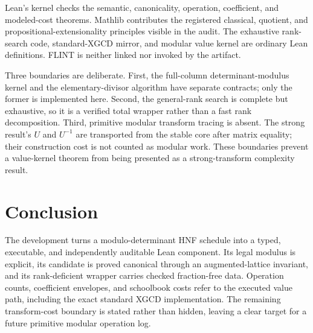 \documentclass[11pt]{article}
\begin{document}
Lean's kernel checks the semantic, canonicality, operation, coefficient, and
modeled-cost theorems.  Mathlib contributes the registered classical,
quotient, and propositional-extensionality principles visible in the audit.
The exhaustive rank-search code, standard-XGCD mirror, and modular value
kernel are ordinary Lean definitions.  FLINT is neither linked nor invoked by
the artifact.

Three boundaries are deliberate.  First, the full-column determinant-modulus
kernel and the elementary-divisor algorithm have separate contracts; only the
former is implemented here.  Second, the general-rank search is complete but
exhaustive, so it is a verified total wrapper rather than a fast rank
decomposition.  Third, primitive modular transform tracing is absent.  The
strong result's $U$ and $U^{-1}$ are transported from the stable core after
matrix equality; their construction cost is not counted as modular work.
These boundaries prevent a value-kernel theorem from being presented as a
strong-transform complexity result.

\section{Conclusion}

The development turns a modulo-determinant HNF schedule into a typed,
executable, and independently auditable Lean component.  Its legal modulus is
explicit, its candidate is proved canonical through an augmented-lattice
invariant, and its rank-deficient wrapper carries checked fraction-free data.
Operation counts, coefficient envelopes, and schoolbook costs refer to the
executed value path, including the exact standard XGCD implementation.  The
remaining transform-cost boundary is stated rather than hidden, leaving a
clear target for a future primitive modular operation log.



\end{document}
